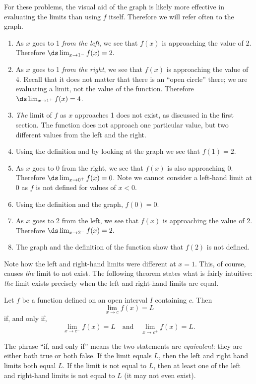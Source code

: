 {For these problems, the visual aid of the graph is likely more effective in evaluating the limits than using $f$ itself. Therefore we will refer often to the graph.
\begin{enumerate}
	\item	As $x$ goes to 1 \textit{from the left}, we see that $f(x)$ is approaching the value of 2. Therefore $\ds \lim_{x\to 1^-} f(x) =2.$
	\item	As $x$ goes to 1 \textit{from the right}, we see that $f(x)$ is approaching the value of 4. Recall that it does not matter that there is an ``open circle'' there; we are evaluating a limit, not the value of the function. Therefore $\ds \lim_{x\to 1^+} f(x)=4$.
	\item	\textit{The} limit of $f$ as $x$ approaches 1 does not exist, as discussed in the first section. The function does not approach one particular value, but two different values from the left and the right.
	\item	Using the definition and by looking at the graph we see that $f(1) = 2$.
	\item	As $x$ goes to 0 from the right, we see that $f(x)$ is also approaching 0. Therefore $\ds \lim_{x\to 0^+} f(x)=0$. Note we cannot consider a left-hand limit at 0 as $f$ is not defined for values of $x<0$.
	\item	Using the definition and the graph, $f(0) = 0$.
	\item	As $x$ goes to 2 from the left, we see that $f(x)$ is approaching the value of 2. Therefore $\ds \lim_{x\to 2^-} f(x)=2.$
	\item	The graph and the definition of the function show that $f(2)$ is not defined.\eoehere
\end{enumerate}}

Note how the left and right-hand limits were different at $x=1$. This, of course, causes \textit{the} limit to not exist. The following theorem states what is fairly intuitive: \textit{the} limit exists precisely when the left and right-hand limits are equal.

{Let $f$ be a function defined on an open interval $I$ containing $c$.  Then \[\lim_{x\to c}f(x) = L\] if, and only if, \[\lim_{x\to c^-}f(x) = L \quad \text{and} \quad \lim_{x\to c^+}f(x) = L.\]}

The phrase ``if, and only if'' means the two statements are \textit{equivalent}: they are either both true or both false. If the limit equals $L$, then the left and right hand limits both equal $L$. If the limit is not equal to $L$, then at least one of the left and right-hand limits is not equal to $L$ (it may not even exist).
			
